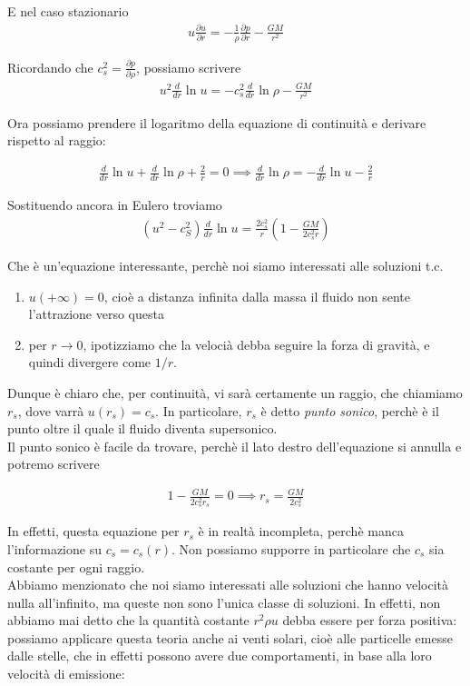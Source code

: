 \documentclass{report}
\begin{document}
E nel caso stazionario
\begin{align}
    u\frac{\partial u}{\partial r} = -\frac{1}{\rho}\frac{\partial p}{\partial r} - \frac{GM}{r^2}
\end{align}

Ricordando che \(c_s^2 = \frac{\partial p}{\partial \rho}\), possiamo scrivere
\begin{align}
    u^2 \frac{d}{dr}\ln{u} = -c_s^2 \frac{d}{dr}\ln\rho - \frac{GM}{r^2}
\end{align}

Ora possiamo prendere il logaritmo della equazione di continuità e derivare rispetto al raggio: 

\begin{align}
    \frac{d}{dr}\ln u + \frac{d}{dr}\ln\rho +  \frac{2}{r} = 0 \implies \frac{d}{dr}\ln\rho = -\frac{d}{dr}\ln u - \frac{2}{r}
\end{align}

Sostituendo ancora in Eulero troviamo 
\begin{align}
    (u^2- c_S^2)\frac{d}{dr}\ln u = \frac{2c_s^2}{r}\left(1 - \frac{GM}{2c_s^2r} \right)
\end{align}

Che è un'equazione interessante, perchè noi siamo interessati alle soluzioni t.c. 
\begin{enumerate}
    \item \(u(+\infty)=0\), cioè a distanza infinita dalla massa il fluido non sente l'attrazione verso questa
    \item per \(r\rightarrow 0\), ipotizziamo che la velocià debba seguire la forza di gravità, e quindi divergere come \(1/r\). 
\end{enumerate}

Dunque è chiaro che, per continuità, vi sarà certamente un raggio, che chiamiamo \(r_s\), dove varrà \(u(r_s) = c_s\). In particolare, \(r_s\) è detto \emph{punto sonico}, perchè è il punto oltre il quale il fluido diventa supersonico. \\

Il punto sonico è facile da trovare, perchè il lato destro dell'equazione si annulla e potremo scrivere

\begin{align}
    1 - \frac{GM}{2c_s^2r_s} = 0 \implies r_s = \frac{GM}{2c_s^2}
\end{align}

In effetti, questa equazione per \(r_s\) è in realtà incompleta, perchè manca l'informazione su \(c_s = c_s(r)\). Non possiamo supporre in particolare che \(c_s\) sia costante per ogni raggio. \\
Abbiamo menzionato che noi siamo interessati alle soluzioni che hanno velocità nulla all'infinito, ma queste non sono l'unica classe di soluzioni. In effetti, non abbiamo mai detto che la quantità costante \(r^2\rho u\) debba essere per forza positiva: possiamo applicare questa teoria anche ai venti solari, cioè alle particelle emesse dalle stelle, che in effetti possono avere due comportamenti, in base alla loro velocità di emissione: 
\end{document}
